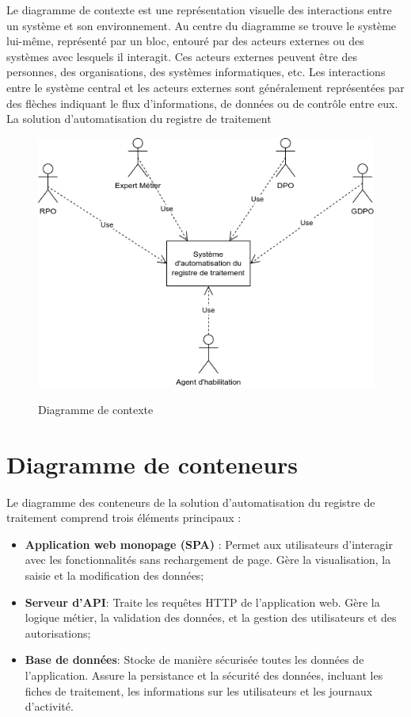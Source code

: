 Le diagramme de contexte est une représentation visuelle des interactions entre un système et son environnement. Au centre du diagramme se trouve le système lui-même, représenté par un bloc, entouré par des acteurs externes ou des systèmes avec lesquels il interagit. Ces acteurs externes peuvent être des personnes, des organisations, des systèmes informatiques, etc. Les interactions entre le système central et les acteurs externes sont généralement représentées par des flèches indiquant le flux d'informations, de données ou de contrôle entre eux. \\

\noindent La solution d'automatisation du registre de traitement

\begin{figure}[H]
    \centering
    \includegraphics[width=.8\textwidth]{images/context-diagram.drawio.png} \\[.4cm]
    \caption{Diagramme de contexte}
\end{figure}


\clearpage

\section{Diagramme de conteneurs}

\noindent Le diagramme des conteneurs de la solution d'automatisation du registre de traitement comprend trois éléments principaux :


\begin{itemize}
    \item \textbf{Application web monopage (SPA)} : Permet aux utilisateurs d'interagir avec les fonctionnalités sans rechargement de page. Gère la visualisation, la saisie et la modification des données;
    \item \textbf{Serveur d'API}: Traite les requêtes HTTP de l'application web. Gère la logique métier, la validation des données, et la gestion des utilisateurs et des autorisations;
    \item \textbf{Base de données}: Stocke de manière sécurisée toutes les données de l'application. Assure la persistance et la sécurité des données, incluant les fiches de traitement, les informations sur les utilisateurs et les journaux d'activité. \\
\end{itemize}




